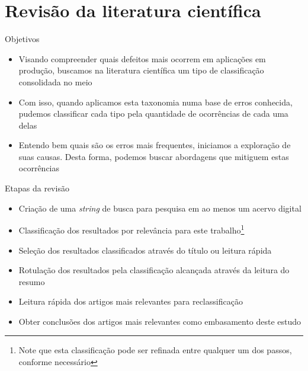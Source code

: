 \documentclass[brazilian]{beamer}
\begin{document}
\section{Revisão da literatura científica}

\begin{frame}{Objetivos}
    \begin{itemize}
        \item Visando compreender quais defeitos mais ocorrem em aplicações em produção, buscamos na literatura científica um tipo de classificação consolidada no meio
        \item Com isso, quando aplicamos esta taxonomia numa base de erros conhecida, pudemos classificar cada tipo pela quantidade de ocorrências de cada uma delas
        \item Entendo bem quais são os erros mais frequentes, iniciamos a exploração de suas causas. Desta forma, podemos buscar abordagens que mitiguem estas ocorrências
    \end{itemize}
\end{frame}

\begin{frame}{Etapas da revisão}
    \begin{itemize}
        \item Criação de uma \textit{string} de busca para pesquisa em ao menos um acervo digital
        \item Classificação dos resultados por relevância para este trabalho\footnote{Note que esta classificação pode ser refinada entre qualquer um dos passos, conforme necessário}
        \item Seleção dos resultados classificados através do título ou leitura rápida
        \item Rotulação dos resultados pela classificação alcançada através da leitura do resumo
        \item Leitura rápida dos artigos mais relevantes para reclassificação
        \item Obter conclusões dos artigos mais relevantes como embasamento deste estudo
    \end{itemize}
\end{frame}
\end{document}
